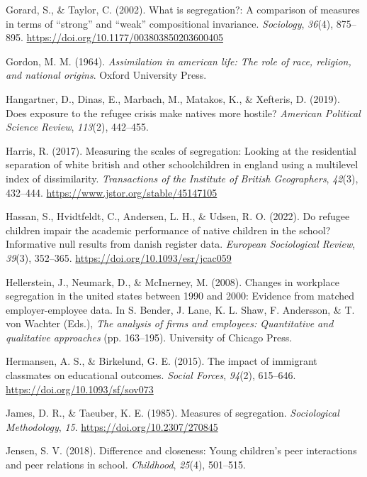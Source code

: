 \documentclass[
]{book}
\newlength{\cslhangindent}
\newenvironment{CSLReferences}[2] %
 {\begin{list}{}{%
  \setlength{\itemindent}{0pt}
  \setlength{\leftmargin}{0pt}
  \setlength{\parsep}{0pt}
  \ifodd #1
   \setlength{\leftmargin}{\cslhangindent}
   \setlength{\itemindent}{-1\cslhangindent}
  \fi
  \setlength{\itemsep}{#2\baselineskip}}}
 {\end{list}}
\begin{document}
\begin{CSLReferences}{1}{0}
Gorard, S., \& Taylor, C. (2002). What is segregation?: A comparison of measures in terms of {``strong''} and {``weak''} compositional invariance. \emph{Sociology}, \emph{36}(4), 875--895. \url{https://doi.org/10.1177/003803850203600405}

Gordon, M. M. (1964). \emph{Assimilation in american life: The role of race, religion, and national origins}. Oxford University Press.

Hangartner, D., Dinas, E., Marbach, M., Matakos, K., \& Xefteris, D. (2019). Does exposure to the refugee crisis make natives more hostile? \emph{American Political Science Review}, \emph{113}(2), 442--455.

Harris, R. (2017). Measuring the scales of segregation: Looking at the residential separation of white british and other schoolchildren in england using a multilevel index of dissimilarity. \emph{Transactions of the Institute of British Geographers}, \emph{42}(3), 432--444. \url{https://www.jstor.org/stable/45147105}

Hassan, S., Hvidtfeldt, C., Andersen, L. H., \& Udsen, R. O. (2022). Do refugee children impair the academic performance of native children in the school? Informative null results from danish register data. \emph{European Sociological Review}, \emph{39}(3), 352--365. \url{https://doi.org/10.1093/esr/jcac059}

Hellerstein, J., Neumark, D., \& McInerney, M. (2008). Changes in workplace segregation in the united states between 1990 and 2000: Evidence from matched employer-employee data. In S. Bender, J. Lane, K. L. Shaw, F. Andersson, \& T. von Wachter (Eds.), \emph{The analysis of firms and employees: Quantitative and qualitative approaches} (pp. 163--195). University of Chicago Press.

Hermansen, A. S., \& Birkelund, G. E. (2015). The impact of immigrant classmates on educational outcomes. \emph{Social Forces}, \emph{94}(2), 615--646. \url{https://doi.org/10.1093/sf/sov073}

James, D. R., \& Taeuber, K. E. (1985). Measures of segregation. \emph{Sociological Methodology}, \emph{15}. \url{https://doi.org/10.2307/270845}

Jensen, S. V. (2018). Difference and closeness: Young children's peer interactions and peer relations in school. \emph{Childhood}, \emph{25}(4), 501--515.


\end{CSLReferences}
\end{document}
